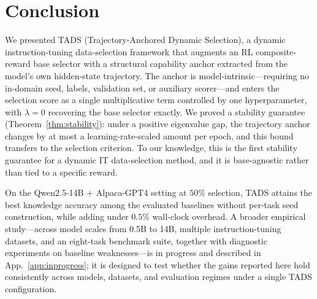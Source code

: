 \section{Conclusion}
\label{sec:conclusion}

We presented \textsc{TADS} (Trajectory-Anchored Dynamic Selection),
a dynamic instruction-tuning data-selection framework that augments
an RL composite-reward base selector with a structural capability
anchor extracted from the model's own hidden-state trajectory. The
anchor is model-intrinsic---requiring no in-domain seed, labels,
validation set, or auxiliary scorer---and enters the selection score
as a single multiplicative term controlled by one hyperparameter,
with $\lambda{=}0$ recovering the base selector exactly. We proved a
stability guarantee (Theorem~\ref{thm:stability}): under a positive
eigenvalue gap, the trajectory anchor changes by at most a
learning-rate-scaled amount per epoch, and this bound transfers to
the selection criterion. To our knowledge, this is the first
stability guarantee for a dynamic IT data-selection method, and it
is base-agnostic rather than tied to a specific reward.

On the Qwen2.5-14B + Alpaca-GPT4 setting at $50\%$ selection,
\textsc{TADS} attains the best knowledge accuracy among the
evaluated baselines without per-task seed construction, while adding
under $0.5\%$ wall-clock overhead. A broader empirical study---across
model scales from 0.5B to 14B, multiple instruction-tuning datasets,
and an eight-task benchmark suite, together with diagnostic
experiments on baseline weaknesses---is in progress and described in
App.~\ref{app:inprogress}; it is designed to test whether the gains
reported here hold consistently across models, datasets, and
evaluation regimes under a single \textsc{TADS} configuration.